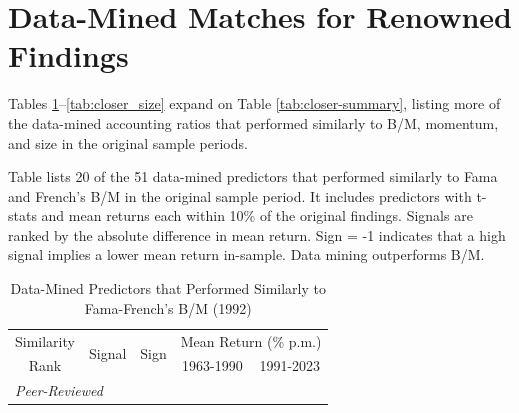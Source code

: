 \section{Data-Mined Matches for Renowned Findings}\label{sec:ia-closer}

Tables \ref{tab:closer_bmdec}--\ref{tab:closer_size} expand on Table \ref{tab:closer-summary}, listing more of the data-mined accounting ratios that performed similarly to B/M, momentum, and size in the original sample periods.

\begin{table}[p]
\caption{Data-Mined Predictors that Performed Similarly to Fama-French's B/M (1992)}
\label{tab:closer_bmdec}

\begin{singlespace}
\noindent Table lists 20 of the 51 data-mined predictors that performed similarly to Fama and French's \citeyearpar{fama1992cross} B/M in the original sample period. It includes predictors with t-stats and mean returns each within 10\% of the original findings. Signals are ranked by the absolute difference in mean return. Sign = -1 indicates that a high signal implies a lower mean return in-sample. Data mining outperforms  B/M.
\end{singlespace}
\begin{centering}
\vspace{0ex}
\par\end{centering}
\centering{}\setlength{\tabcolsep}{0.7ex} \small
\begin{center}
\begin{tabular}{rlrrr} \toprule 
\multicolumn{1}{c}{Similarity} 
    & \multirow{2}[2]{*}{Signal} 
    & \multicolumn{1}{l}{\multirow{2}[2]{*}{Sign}} & \multicolumn{2}{c}{Mean Return (\% p.m.)} \\   
\multicolumn{1}{c}{Rank} 
    &   &   
    & \multicolumn{1}{c}{1963-1990} & \multicolumn{1}{c}{1991-2023} \\ \midrule \multicolumn{5}{l}{\textit{Peer-Reviewed}} \\ 
\midrule   

\bottomrule \end{tabular}%
\end{center} 
\end{table}

